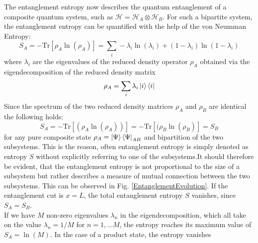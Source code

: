 \documentclass[11pt, a4paper, oneside]{book}
\theoremstyle{definition} %
\begin{document}
The entanglement entropy now describes the quantum entanglement of a composite quantum system, such as $\mathcal{H} = \mathcal{H}_A \otimes \mathcal{H}_B$. For such a bipartite system, the entanglement entropy can be quantified with the help of the von Neumman Entropy:
\begin{equation}
	S_A = - \text{Tr}[\rho_A \ln(\rho_A)] = \sum_i - \lambda_i \ln(\lambda_i) + (1-\lambda_i) \ln(1 -\lambda_i)
	\label{eq:von-Neumann_entropy}
\end{equation}
where $\lambda_i$ are the eigenvalues of the reduced density operator $\rho_A$ obtained via the eigendecomposition of the reduced density matrix
\begin{equation}
	\rho_A = \sum_i \lambda_i \ket{i} \bra{i}
\end{equation}
Since the spectrum of the two reduced density matrices $\rho_A$ and $\rho_B$ are identical the following holds:
\begin{equation}
S_A = -\text{Tr}[(\rho_A \ln(\rho_A))] = - \text{Tr}[(\rho_B\ln(\rho_B)] = S_B
\end{equation}
for any pure composite state $\rho_A = \ket{\Psi} \bra{\Psi}_{AB}$ and bipartition of the two subsystems. This is the reason, often entanglement entropy is simply denoted as entropy $S$ without explicitly referring to one of the subsystems.It should therefore be evident, that the entanglement entropy is not proportional to the size of a subsystem but rather describes a measure of mutual connection between the two subsystems. This can be observed in Fig. \ref{EntanglementEvolution}. If the entanglement cut is $x = L$, the total entanglement entropy $S$ vanishes, since $S_A = S_B$. \\
	
If we have $M$ non-zero eigenvalues $\lambda_n$ in the eigendecomposition, which all take on the value $\lambda_n = 1/M$ for $n = 1, \dots M$, the entropy reaches its maximum value of $S_A = \ln(M)$. In the case of a product state, the entropy vanishes \cite{Peschel2,Neupert2}
\end{document}
